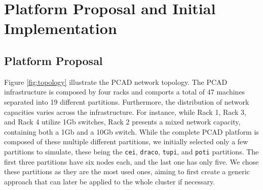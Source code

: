\documentclass[12pt]{article}
\begin{document}
\section{Platform Proposal and Initial Implementation}
\label{sec:orgc1d7abf}

\subsection{Platform Proposal}
\label{sec:org4dcabad}

Figure  \ref{fig:topology} illustrate the PCAD network
topology. The PCAD infrastructure is composed by four racks and
comports a total of 47 machines separated into 19 different
partitions. Furthermore, the distribution of network capacities varies
across the infrastructure. For instance, while Rack 1, Rack 3, and
Rack 4 utilize 1Gb switches, Rack 2 presents a mixed network capacity,
containing both a 1Gb and a 10Gb switch.  While the complete PCAD
platform is composed of these multiple different partitions, we
initially selected only a few partitions to simulate, these being the
\texttt{cei}, \texttt{draco}, \texttt{tupi}, and \texttt{poti} partitions. The first three partitions have
six nodes each, and the last one has only five. We chose these
partitions as they are the most used ones, aiming to first create a
generic approach that can later be applied to the whole cluster if
necessary.
\end{document}
